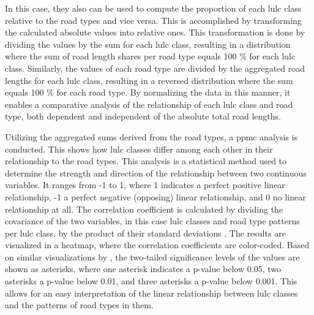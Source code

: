 In this case, they also can be used to compute the proportion of each \gls{lulc} class relative to the road types and vice versa. This is accomplished by transforming the calculated absolute values into relative ones. This transformation is done by dividing the values by the sum for each \gls{lulc} class, resulting in a distribution where the sum of road length shares per road type equals 100 \% for each \gls{lulc} class. Similarly, the values of each road type are divided by the aggregated road lengths for each \gls{lulc} class, resulting in a reversed distribution where the sum equals 100 \% for each road type. By normalizing the data in this manner, it enables a comparative analysis of the relationship of each \gls{lulc} class and road type, both dependent and independent of the absolute total road lengths.

Utilizing the aggregated sums derived from the road types, a \gls{ppmc} analysis is conducted. This shows how \gls{lulc} classes differ among each other in their relationship to the road types. This analysis is a statistical method used to determine the strength and direction of the relationship between two continuous variables. It ranges from -1 to 1, where 1 indicates a perfect positive linear relationship, -1 a perfect negative (opposing) linear relationship, and 0 no linear relationship at all. The correlation coefficient is calculated by dividing the covariance of the two variables, in this case \gls{lulc} classes and road type patterns per \gls{lulc} class, by the product of their standard deviations \autocite{Awuh.Japhets.ea2019,Feng.Myint2016,Kibena.Nhapi.ea2014}. The results are visualized in a heatmap, where the correlation coefficients are color-coded. Based on similar visualizations by \textcite{Al-Taei.Alesheikh.ea2023,Chen.Zhou.ea2016,Khamchiangta.Dhakal2020}, the two-tailed significance levels of the values are shown as asterisks, where one asterisk indicates a p-value below 0.05, two asterisks a p-value below 0.01, and three asterisks a p-value below 0.001. This allows for an easy interpretation of the linear relationship between \gls{lulc} classes and the patterns of road types in them.

